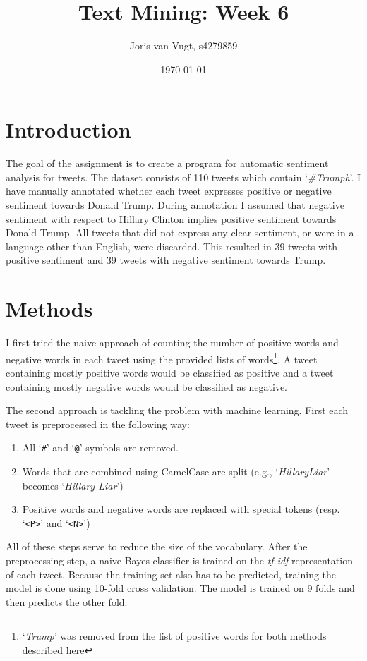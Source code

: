 \documentclass{article}
\title{Text Mining: Week 6}
\author{Joris van Vugt, s4279859}
\date{\today}
\begin{document}
\maketitle
\section{Introduction}
The goal of the assignment is to create a program for automatic sentiment analysis for tweets. The dataset consists of 110 tweets which contain `\emph{\#Trumph}'. I have manually annotated whether each tweet expresses positive or negative sentiment towards Donald Trump. During annotation I assumed that negative sentiment with respect to Hillary Clinton implies positive sentiment towards Donald Trump. All tweets that did not express any clear sentiment, or were in a language other than English, were discarded. This resulted in 39 tweets with positive sentiment and 39 tweets with negative sentiment towards Trump.

\section{Methods}
I first tried the naive approach of counting the number of positive words and negative words in each tweet using the provided lists of words\footnote{`\emph{Trump}' was removed from the list of positive words for both methods described here}. A tweet containing mostly positive words would be classified as positive and a tweet containing mostly negative words would be classified as negative.
\par
The second approach is tackling the problem with machine learning. First each tweet is preprocessed in the following way: 
\begin{enumerate}
\item All `\texttt{\#}' and `\texttt{@}' symbols are removed.
\item Words that are combined using CamelCase are split (e.g., `\emph{HillaryLiar}' becomes `\emph{Hillary Liar}')
\item Positive words and negative words are replaced with special tokens (resp. `\texttt{<P>}' and `\texttt{<N>}')
\end{enumerate}
All of these steps serve to reduce the size of the vocabulary. After the preprocessing step, a naive Bayes classifier is trained on the \emph{tf-idf} representation of each tweet. Because the training set also has to be predicted, training the model is done using 10-fold cross validation. The model is trained on 9 folds and then predicts the other fold.
\end{document}
